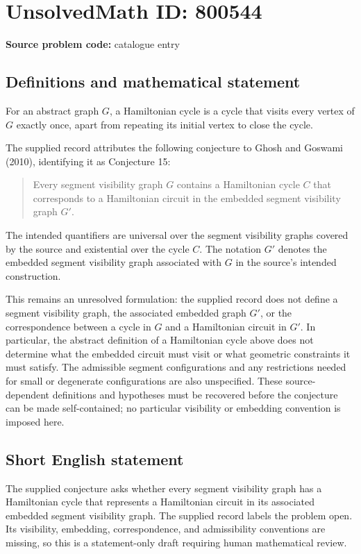 \documentclass[11pt]{article}
\begin{document}
\section*{UnsolvedMath ID: 800544}
\textbf{Source problem code:} catalogue entry
\subsection{Definitions and mathematical statement}
For an abstract graph \(G\), a Hamiltonian cycle is a cycle that visits every vertex of \(G\) exactly once, apart from repeating its initial vertex to close the cycle.

The supplied record attributes the following conjecture to Ghosh and Goswami (2010), identifying it as Conjecture 15:
\begin{quote}
Every segment visibility graph \(G\) contains a Hamiltonian cycle \(C\) that corresponds to a Hamiltonian circuit in the embedded segment visibility graph \(G'\).
\end{quote}
The intended quantifiers are universal over the segment visibility graphs covered by the source and existential over the cycle \(C\). The notation \(G'\) denotes the embedded segment visibility graph associated with \(G\) in the source's intended construction.

This remains an unresolved formulation: the supplied record does not define a segment visibility graph, the associated embedded graph \(G'\), or the correspondence between a cycle in \(G\) and a Hamiltonian circuit in \(G'\). In particular, the abstract definition of a Hamiltonian cycle above does not determine what the embedded circuit must visit or what geometric constraints it must satisfy. The admissible segment configurations and any restrictions needed for small or degenerate configurations are also unspecified. These source-dependent definitions and hypotheses must be recovered before the conjecture can be made self-contained; no particular visibility or embedding convention is imposed here.
\subsection{Short English statement}
The supplied conjecture asks whether every segment visibility graph has a Hamiltonian cycle that represents a Hamiltonian circuit in its associated embedded segment visibility graph. The supplied record labels the problem open. Its visibility, embedding, correspondence, and admissibility conventions are missing, so this is a statement-only draft requiring human mathematical review.
\end{document}
